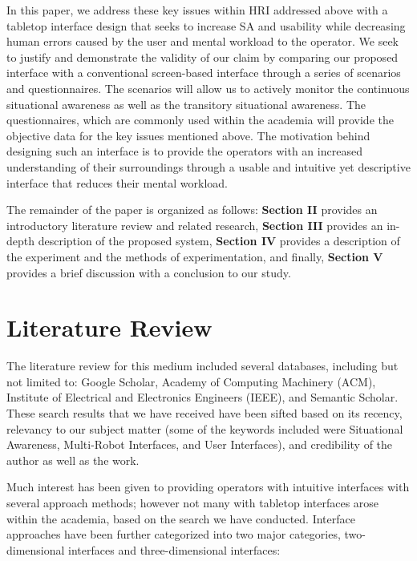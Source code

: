 \documentclass[conference]{IEEEtran}
\begin{document}
In this paper, we address these key issues within HRI addressed above with a tabletop interface design that seeks to increase SA and usability while decreasing human errors caused by the user and mental workload to the operator. We seek to justify and demonstrate the validity of our claim by comparing our proposed interface with a conventional screen-based interface through a series of scenarios and questionnaires. The scenarios will allow us to actively monitor the continuous situational awareness as well as the transitory situational awareness. The questionnaires, which are commonly used within the academia will provide the objective data for the key issues mentioned above. The motivation behind designing such an interface is to provide the operators with an increased understanding of their surroundings through a usable and intuitive yet descriptive interface that reduces their mental workload. 


The remainder of the paper is organized as follows: \textbf{Section II} provides an introductory literature review and related research, \textbf{Section III} provides an in-depth description of the proposed system, \textbf{Section IV} provides a description of the experiment and the methods of experimentation, and finally, \textbf{Section V} provides a brief discussion with a conclusion to our study.






\section{Literature Review}
The literature review for this medium included several databases, including but not limited to: Google Scholar, Academy of Computing Machinery (ACM), Institute of Electrical and Electronics Engineers (IEEE), and Semantic Scholar. These search results that we have received have been sifted based on its recency, relevancy to our subject matter (some of the keywords included were Situational Awareness, Multi-Robot Interfaces, and User Interfaces), and credibility of the author as well as the work. 

Much interest has been given to providing operators with intuitive interfaces with several approach methods; however not many with tabletop interfaces arose within the academia, based on the search we have conducted. Interface approaches have been further categorized into two major categories, two-dimensional interfaces and three-dimensional interfaces:
\end{document}
